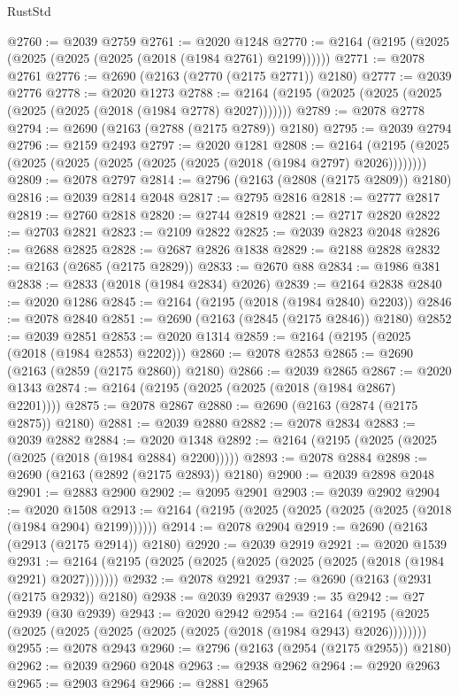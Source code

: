 \begin{lexlean}{RustStd}
\begin{coremodule}
@2760 := @2039 @2759
@2761 := @2020 @1248
@2770 := @2164 (@2195 (@2025 (@2025 (@2025 (@2025 (@2018 (@1984 @2761) @2199))))))
@2771 := @2078 @2761
@2776 := @2690 (@2163 (@2770 (@2175 @2771)) @2180)
@2777 := @2039 @2776
@2778 := @2020 @1273
@2788 := @2164 (@2195 (@2025 (@2025 (@2025 (@2025 (@2025 (@2018 (@1984 @2778) @2027)))))))
@2789 := @2078 @2778
@2794 := @2690 (@2163 (@2788 (@2175 @2789)) @2180)
@2795 := @2039 @2794
@2796 := @2159 @2493
@2797 := @2020 @1281
@2808 := @2164 (@2195 (@2025 (@2025 (@2025 (@2025 (@2025 (@2025 (@2018 (@1984 @2797) @2026))))))))
@2809 := @2078 @2797
@2814 := @2796 (@2163 (@2808 (@2175 @2809)) @2180)
@2816 := @2039 @2814 @2048
@2817 := @2795 @2816
@2818 := @2777 @2817
@2819 := @2760 @2818
@2820 := @2744 @2819
@2821 := @2717 @2820
@2822 := @2703 @2821
@2823 := @2109 @2822
@2825 := @2039 @2823 @2048
@2826 := @2688 @2825
@2828 := @2687 @2826 @1838
@2829 := @2188 @2828
@2832 := @2163 (@2685 (@2175 @2829))
@2833 := @2670 @88
@2834 := @1986 @381
@2838 := @2833 (@2018 (@1984 @2834) @2026)
@2839 := @2164 @2838
@2840 := @2020 @1286
@2845 := @2164 (@2195 (@2018 (@1984 @2840) @2203))
@2846 := @2078 @2840
@2851 := @2690 (@2163 (@2845 (@2175 @2846)) @2180)
@2852 := @2039 @2851
@2853 := @2020 @1314
@2859 := @2164 (@2195 (@2025 (@2018 (@1984 @2853) @2202)))
@2860 := @2078 @2853
@2865 := @2690 (@2163 (@2859 (@2175 @2860)) @2180)
@2866 := @2039 @2865
@2867 := @2020 @1343
@2874 := @2164 (@2195 (@2025 (@2025 (@2018 (@1984 @2867) @2201))))
@2875 := @2078 @2867
@2880 := @2690 (@2163 (@2874 (@2175 @2875)) @2180)
@2881 := @2039 @2880
@2882 := @2078 @2834
@2883 := @2039 @2882
@2884 := @2020 @1348
@2892 := @2164 (@2195 (@2025 (@2025 (@2025 (@2018 (@1984 @2884) @2200)))))
@2893 := @2078 @2884
@2898 := @2690 (@2163 (@2892 (@2175 @2893)) @2180)
@2900 := @2039 @2898 @2048
@2901 := @2883 @2900
@2902 := @2095 @2901
@2903 := @2039 @2902
@2904 := @2020 @1508
@2913 := @2164 (@2195 (@2025 (@2025 (@2025 (@2025 (@2018 (@1984 @2904) @2199))))))
@2914 := @2078 @2904
@2919 := @2690 (@2163 (@2913 (@2175 @2914)) @2180)
@2920 := @2039 @2919
@2921 := @2020 @1539
@2931 := @2164 (@2195 (@2025 (@2025 (@2025 (@2025 (@2025 (@2018 (@1984 @2921) @2027)))))))
@2932 := @2078 @2921
@2937 := @2690 (@2163 (@2931 (@2175 @2932)) @2180)
@2938 := @2039 @2937
@2939 := 35
@2942 := @27 @2939 (@30 @2939)
@2943 := @2020 @2942
@2954 := @2164 (@2195 (@2025 (@2025 (@2025 (@2025 (@2025 (@2025 (@2018 (@1984 @2943) @2026))))))))
@2955 := @2078 @2943
@2960 := @2796 (@2163 (@2954 (@2175 @2955)) @2180)
@2962 := @2039 @2960 @2048
@2963 := @2938 @2962
@2964 := @2920 @2963
@2965 := @2903 @2964
@2966 := @2881 @2965

\end{coremodule}
\end{lexlean}
